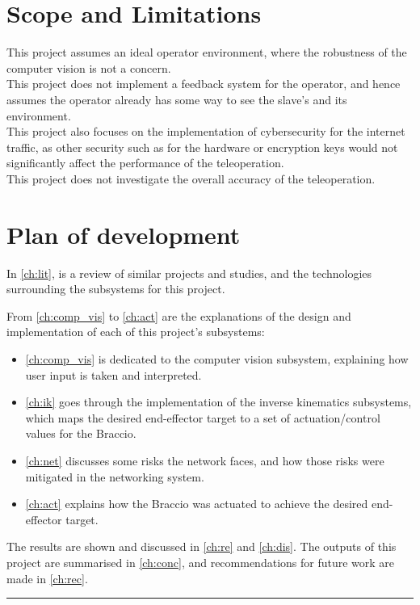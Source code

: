 \section{Scope and Limitations}
This project assumes an ideal operator environment, where the robustness of the computer vision is not a concern.\\
This project does not implement a feedback system for the operator, and hence assumes the operator already has some way to see the slave's and its environment.\\
This project also focuses on the implementation of cybersecurity for the internet traffic, as other security such as for the hardware or encryption keys would not significantly affect the performance of the teleoperation.\\
This project does not investigate the overall accuracy of the teleoperation.

\newpage
\section{Plan of development}

In \autoref{ch:lit}, is a review of similar projects and studies, and the technologies surrounding the subsystems for this project.

From \autoref{ch:comp_vis} to \autoref{ch:act} are the explanations of the design and implementation of each of this project's subsystems:
\begin{itemize}[nosep]
    \item \autoref{ch:comp_vis} is dedicated to the computer vision subsystem, explaining how user input is taken and interpreted.
    \item \autoref{ch:ik} goes through the implementation of the inverse kinematics subsystems, which maps the desired end-effector target to a set of actuation/control values for the Braccio.
    \item \autoref{ch:net} discusses some risks the network faces, and how those risks were mitigated in the networking system.
    \item \autoref{ch:act} explains how the Braccio was actuated to achieve the desired end-effector target.
\end{itemize}

The results are shown and discussed in \autoref{ch:re} and \autoref{ch:dis}. The outputs of this project are summarised in \autoref{ch:conc}, and recommendations for future work are made in \autoref{ch:rec}.

\vspace{2em}
\hrule
